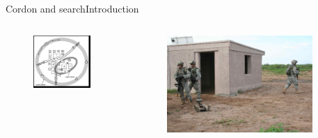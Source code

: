 \begin{frame}{Cordon and search}{Introduction}

\begin{columns}
\begin{minipage}{\textwidth}
\begin{figure}
\centering
\includegraphics[width = 0.9\textwidth]{./figure/cordon_and_search.jpg}
\end{figure}
\end{minipage}

\begin{minipage}{\textwidth}
\begin{figure}
\centering
\includegraphics[width = 0.9\textwidth]{./figure/soldier_and_robot.jpg}
\end{figure}
\end{minipage}

\end{columns}

\end{frame}
